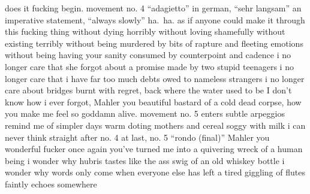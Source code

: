 \documentclass[12pt]{article}
\begin{document}
does it fucking begin{}.\newline
movement no. 4 “adagietto”\newline
in german, “sehr langsam”\newline
an imperative statement, “always slowly”\newline
ha{}.\ ha{}.\newline
as if anyone could make it through this fucking thing\newline
without dying horribly\newline
without loving shamefully\newline
without existing terribly\newline
without being murdered by bits of rapture and fleeting emotions\newline
without being having your sanity consumed by counterpoint and cadence\newline
i no longer care that she forgot about a promise made by two stupid teenagers\newline
i no longer care that i have far too much debts owed to nameless strangers\newline
i no longer care about bridges burnt with regret, back where the water used to be\newline
I don’t know how i ever forgot,\newline
Mahler you beautiful bastard of a cold dead corpse,\newline
how you make me feel so goddamn alive{}.\newline
\newline
\newline
movement no. 5 enters\newline
subtle arpeggios remind me of simpler days\newline
warm doting mothers and cereal soggy with milk\newline
i can never think straight after no. 4\newline
at last, no. 5 “rondo (final)”\newline
Mahler you wonderful fucker\newline
once again you’ve turned me into a quivering wreck of a human being\newline
i wonder why hubris tastes like the ass swig of an old whiskey bottle\newline
i wonder why words only come when everyone else has left\newline
a tired giggling of flutes faintly echoes somewhere\newline
\end{document}
